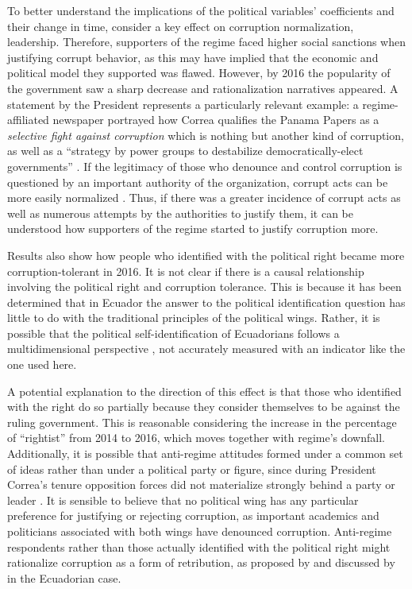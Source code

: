 \documentclass[12pt,a4]{article}\usepackage[]{graphicx}\usepackage[]{xcolor}
\begin{document}
To better understand the implications of the political variables' coefficients and their change in time, consider a key effect on corruption normalization, leadership. Therefore, supporters of the regime faced higher social sanctions when justifying corrupt behavior, as this may have implied that the economic and political model they supported was flawed. However, by 2016 the popularity of the government saw a sharp decrease and rationalization narratives appeared. A statement by the President represents a particularly relevant example: a regime-affiliated newspaper portrayed how Correa qualifies the Panama Papers as a \textit{selective fight against corruption} which is nothing but another kind of corruption, as well as a \enquote{strategy by power groups to destabilize democratically-elect governments} \parencite[para. 5-7]{Telegrafo.2016}. If the legitimacy of those who denounce and control corruption is questioned by an important authority of the organization, corrupt acts can be more easily normalized \parencite{Ashforth.2003}. Thus, if there was a greater incidence of corrupt acts as well as numerous attempts by the authorities to justify them, it can be understood how supporters of the regime started to justify corruption more.

Results also show how people who identified with the political right became more corruption-tolerant in 2016. It is not clear if there is a causal relationship involving the political right and corruption tolerance. This is because it has been determined that in Ecuador the answer to the political identification question has little to do with the traditional principles of the political wings. Rather, it is possible that the political self-identification of Ecuadorians follows a multidimensional perspective \parencite{Moncagatta.2020b}, not accurately measured with an indicator like the one used here. 

A potential explanation to the direction of this effect is that those who identified with the right do so partially because they consider themselves to be against the ruling government. This is reasonable considering the increase in the percentage of \enquote{rightist} from 2014 to 2016, which moves together with regime's downfall. Additionally, it is possible that anti-regime attitudes formed under a common set of ideas rather than under a political party or figure, since during President Correa's tenure opposition forces did not materialize strongly behind a party or leader \parencite{Melendez.2017}. It is sensible to believe that no political wing has any particular preference for justifying or rejecting corruption, as important academics \parencite{Holcombe.2015} and politicians \parencite{Morris.2021} associated with both wings have denounced corruption. Anti-regime respondents rather than those actually identified with the political right might rationalize corruption as a form of retribution, as proposed by \textcite{Ashforth.2003} and discussed by \textcite{Adoum.2000} in the Ecuadorian case.
\end{document}

